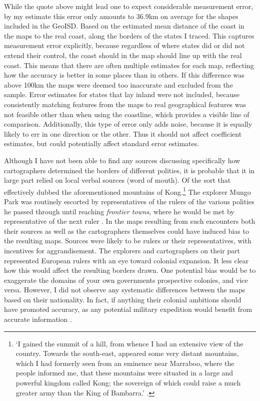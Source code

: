 \documentclass[12pt]{article}
\begin{document}
While the quote above might lead one to expect considerable measurement error,
by my estimate this error only amounts to 36.9km on average for the shapes
included in the GeoISD. Based on the estimated mean distance of the coast in the
maps to the real coast, along the borders of the states I traced. This captures
measurement error explicitly, because regardless of where states did or did not
extend their control, the coast should in the map should line up with the real
coast. This means that there are often multiple estimates for each map,
reflecting how the accuracy is better in some places than in others. If this
difference was above 100km the maps were deemed too inaccurate and excluded from
the sample. Error estimates for states that lay inland were not included,
because consistently matching features from the maps to real geographical
features was not feasible other than when using the coastline, which provides a
visible line of comparison. Additionally, this type of error only adds noise,
because it is equally likely to err in one direction or the other. Thus it
should not affect coefficient estimates, but could potentially affect standard
error estimates.

Although I have not been able to find any sources discussing specifically how
cartographers determined the borders of different polities, it is probable that
it in large part relied on local verbal sources (word of mouth). Of the sort
that effectively dubbed the aforementioned mountains of Kong.\footnote{`I gained
	the summit of a hill, from whence I had an extensive view of the
	country. Towards the south-east, appeared some very distant mountains,
	which I had formerly seen from an eminence near Marraboo, where the
people informed me, that these mountains were situated in a large and powerful
kingdom called Kong; the sovereign of which could raise a much greater army than
the King of Bambarra.' \citep[CHAPTER XVIII]{ParkMungo2015Titi}.} The explorer
Mungo Park was routinely escorted by representatives of the rulers of the
various polities he passed through until reaching \textit{frontier towns}, where
he would be met by representative of the next ruler \citep{ParkMungo2015Titi}.
In the maps resulting from such encounters both their sources as well as the
cartographers themselves could have induced bias to the resulting maps. Sources
were likely to be rulers or their representatives, with incentives for
aggrandisement. The explorers and cartographers on their part represented
European rulers with an eye toward colonial expansion. It less clear how this
would affect the resulting borders drawn. One potential bias would be to
exaggerate the domains of your own governments prospective colonies, and vice
versa. However, I did not observe any systematic differences between the maps
based on their nationality. In fact, if anything their colonial ambitions should
have promoted accuracy, as any potential military expedition would benefit from
accurate information \citep{Bassett_1994}.
\end{document}
